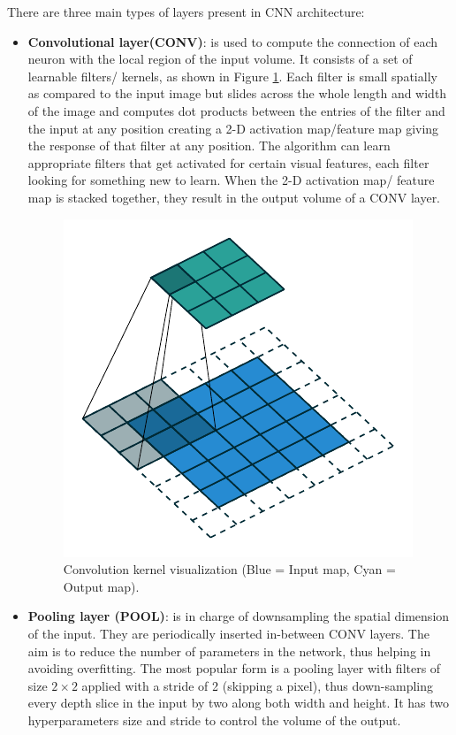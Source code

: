 There are three main types of layers present in CNN architecture: 
\begin{itemize}

\item \textbf{Convolutional layer(CONV)}: is used to compute the connection of each neuron with the local region of the input volume. It consists of a set of learnable filters/ kernels, as shown in Figure \ref{fig:CNN_FIG2A}. Each filter is small spatially as compared to the input image but slides across the whole length and width of the image and computes dot products between the entries of the filter and the input at any position creating a 2-D activation map/feature map giving the response of that filter at any position. The algorithm can learn appropriate filters that get activated for certain visual features, each filter looking for something new to learn.  When the 2-D activation map/ feature map is stacked together, they result in the output volume of a CONV layer. 

\begin{figure}
    \centering
    \includegraphics{Figures/Chp2_CNN/FIG2A.pdf}
    \caption{Convolution kernel visualization \parencite{dumoulin2016guide} (Blue = Input map, Cyan = Output map).}
    \label{fig:CNN_FIG2A}
\end{figure}

\item \textbf{Pooling layer (POOL)}: is in charge of downsampling the spatial dimension of the input. They are periodically inserted in-between CONV layers. The aim is to reduce the number of parameters in the network, thus helping in avoiding overfitting. The most popular form is a pooling layer with filters of size $2 \times 2$ applied with a stride of 2 (skipping a pixel), thus down-sampling every depth slice in the input by two along both width and height. It has two hyperparameters size and stride to control the volume of the output.


\end{itemize}
